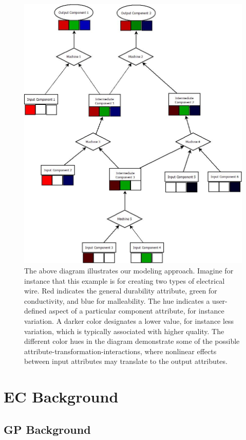 \documentclass{IEEEtran}
\begin{document}
\begin{figure}[!t]
\centerline{\includegraphics[width=\columnwidth]{Diagram1.jpeg}}
\caption{The above diagram illustrates our modeling approach. Imagine for instance that this example is for creating two types of electrical wire. Red indicates the general durability attribute, green for conductivity, and blue for malleability. The hue indicates a user-defined aspect of a particular component attribute, for instance variation. A darker color designates a lower value, for instance less variation, which is typically associated with higher quality. The different color hues in the diagram demonstrate some of the possible attribute-transformation-interactions, where nonlinear effects between input attributes may translate to the output attributes.}
\label{fig1}
\end{figure}

\section{EC Background}
\subsection{GP Background}
\end{document}
